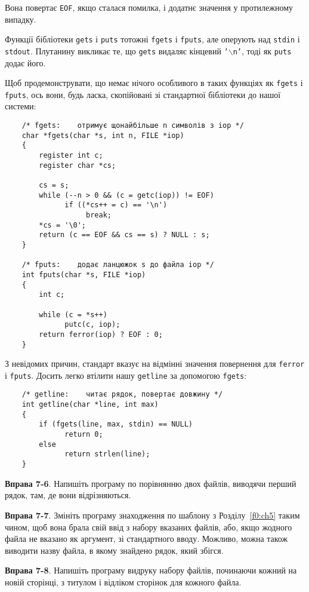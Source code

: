 \documentclass[a4paper,12pt]{book}
\begin{document}
  Вона повертає \texttt{EOF}, якщо сталася помилка, і додатнє значення у протилежному
  випадку.

  Функції бібліотеки \texttt{gets} і \texttt{puts} тотожні \texttt{fgets} і
  \texttt{fputs}, але оперують над \texttt{stdin} і \texttt{stdout}. Плутанину викликає
  те, що \texttt{gets} видаляє кінцевий \texttt{'\mbox{$\backslash$}n'}, тоді як \texttt{puts} додає його.

  Щоб продемонструвати, що немає нічого особливого в таких функціях як \texttt{fgets} і
  \texttt{fputs}, ось вони, будь ласка, скопійовані зі стандартної бібліотеки до нашої
  системи:
  \begin{verbatim}
    /* fgets:    отримує щонайбільше n символів з iop */
    char *fgets(char *s, int n, FILE *iop)
    {
        register int c;
        register char *cs;

        cs = s;
        while (--n > 0 && (c = getc(iop)) != EOF)
              if ((*cs++ = c) == '\n')
                   break;
        *cs = '\0';
        return (c == EOF && cs == s) ? NULL : s;
    }

    /* fputs:    додає ланцюжок s до файла iop */
    int fputs(char *s, FILE *iop)
    {
        int c;

        while (c = *s++)
              putc(c, iop);
        return ferror(iop) ? EOF : 0;
    }
  \end{verbatim}

  З невідомих причин, стандарт вказує на відмінні значення повернення для \texttt{ferror}
  і \texttt{fputs}. Досить легко втілити нашу \texttt{getline} за допомогою
  \texttt{fgets}:
  \begin{verbatim}
    /* getline:    читає рядок, повертає довжину */
    int getline(char *line, int max)
    {
        if (fgets(line, max, stdin) == NULL)
              return 0;
        else
              return strlen(line);
    }
  \end{verbatim}

  \textbf{Вправа 7-6}. Напишіть програму по порівнянню двох файлів, виводячи перший рядок,
  там, де вони відрізняються.

  \textbf{Вправа 7-7}. Змініть програму знаходження по шаблону з
  Розділу~\ref{f0:ch5} таким чином, щоб вона брала свій ввід з набору вказаних
  файлів, або, якщо жодного файла не вказано як аргумент, зі стандартного вводу. Можливо,
  можна також виводити назву файла, в якому знайдено рядок, який збігся.

  \textbf{Вправа 7-8}. Напишіть програму видруку набору файлів, починаючи кожний на новій
  сторінці, з титулом і відліком сторінок для кожного файла.
\end{document}
